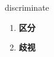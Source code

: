 
\begin{frame}
{\huge discriminate}
\begin{center}
\begin{enumerate}\Large
  \item \textbf{区分}
  \item \textbf{歧视}
\end{enumerate}
\end{center}
\end{frame}
